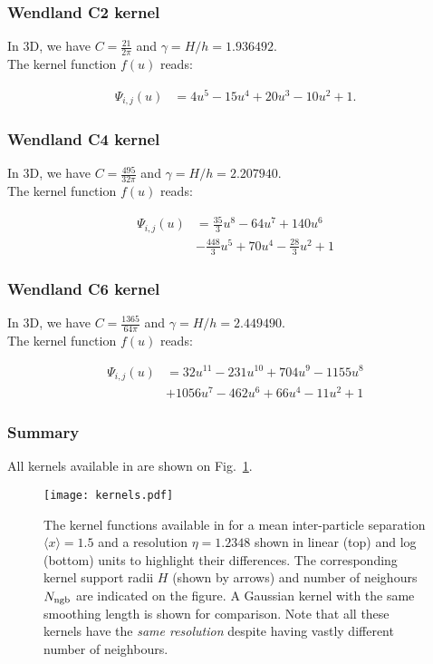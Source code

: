 \subsubsection{Wendland C2 kernel}

In 3D, we have $C=\frac{21}{2\pi}$ and $\gamma=H/h = 1.936492$.\\
The kernel function $f(u)$ reads:

\begin{align}
  \Psi_{i,j}(u) &= 4u^5 - 15u^4 + 20u^3 - 10u^2 + 1.
    \nonumber
\end{align}


\subsubsection{Wendland C4 kernel}

In 3D, we have $C=\frac{495}{32\pi}$ and $\gamma=H/h = 2.207940$.\\
The kernel function $f(u)$ reads:

\begin{align}
  \Psi_{i,j}(u) &= \frac{35}{3}u^8 - 64u^7 + 140u^6     \nonumber\\
  & - \frac{448}{3}u^5 + 70u^4 - \frac{28}{3}u^2 + 1
    \nonumber
\end{align}


\subsubsection{Wendland C6 kernel}

In 3D, we have $C=\frac{1365}{64\pi}$ and $\gamma=H/h = 2.449490$.\\
The kernel function $f(u)$ reads:

\begin{align}
  \Psi_{i,j}(u) &= 32u^{11} - 231u^{10} + 704u^9 - 1155u^8     \nonumber\\
  & + 1056u^7 - 462u^6 + 66u^4 - 11u^2 + 1
    \nonumber
\end{align}


\subsubsection{Summary}

All kernels available in \swift are shown on Fig.~\ref{fig:sph:kernels}.

\begin{figure}
\texttt{[image: kernels.pdf]}
\caption{The kernel functions available in \swift for a mean
  inter-particle separation $\langle x\rangle=1.5$ and a resolution
  $\eta=1.2348$ shown in linear (top) and log (bottom) units to
  highlight their differences. The corresponding kernel support radii
  $H$ (shown by arrows) and number of neighours $N_{\rm ngb}$ are
  indicated on the figure. A Gaussian kernel with the same smoothing
  length is shown for comparison. Note that all these kernels have
  the \emph{same resolution} despite having vastly different number of
  neighbours.}
\label{fig:sph:kernels}
\end{figure}


